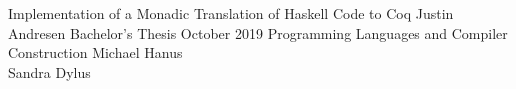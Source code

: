 \documentclass[10pt]{book}
\begin{document}
\frontmatter

\studtitlepage%
  {Implementation of a Monadic Translation of Haskell Code to Coq}
  {}%
  {Justin Andresen}%
  {Bachelor's Thesis}%
  {October 2019}%
  {Programming Languages and Compiler Construction}%
  {Michael Hanus \\ Sandra Dylus}
\cleardoublepage
\eidesstatt

%
\tableofcontents

\setlength{\parindent}{0em}
\setlength{\parskip}{1em}

\mainmatter







\appendix



\backmatter
\tocbibliography
\end{document}

